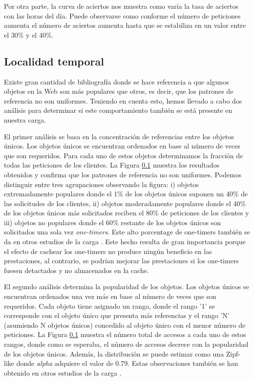 \documentclass[twocolumn]{Jornadas}
\begin{document}
Por otra parte, la curva de aciertos nos muestra como varía la tasa de aciertos con las horas del día. Puede observarse como conforme el número de peticiones aumenta el número de aciertos aumenta hasta que se estabiliza en un valor entre el 30\% y el 40\%.

\subsection{Localidad temporal}

Existe gran cantidad de bibliografía \cite{} donde se hace referencia a que algunos objetos en la Web son más populares que otros, es decir, que los patrones de referencia no son uniformes. Teniendo en cuenta esto, hemos llevado a cabo dos análisis para determinar si este comportamiento también se está presente en nuestra carga.

El primer análisis se basa en la concentración de referencias entre los objetos únicos. Los objetos únicos se encuentran ordenados en base al número de veces que son requeridos. Para cada uno de estos objetos determinamos la fracción de todas las peticiones de los clientes. La Figura \ref{} muestra los resultados obtenidos y confirma que los patrones de referencia no son uniformes. Podemos distinguir entre tres agrupaciones observando la figura: i) objetos extremadamente populares donde el 1\% de los objetos únicos suponen un 40\% de las solicitudes de los clientes, ii) objetos moderadamente populares donde el 40\% de los objetos únicos más solicitados reciben el 80\% de peticiones de los clientes y iii) objetos no populares donde el 60\% restante de los objetos únicos son solicitados una sola vez \emph{one-timers}. Este alto porcentage de one-timers también se da en otros estudios de la carga \cite{}.
Este hecho resulta de gran importancia porque el efecto de cachear los one-timers no produce ningún beneficio en las prestaciones, al contrario, se podrían mejorar las prestaciones si los one-timers fuesen detactados y no almacenados en la cache.

El segundo análisis determina la popularidad de los objetos. Los objetos únicos se encuentran ordenados una vez más en base al número de veces que son requeridos. Cada objeto tiene asignado un rango, donde el rango '1' se corresponde con el objeto único que presenta más referencias y el rango 'N' (asumiendo N objetos únicos) concedido al objeto único con el menor número de peticiones. La Figura \ref{} muestra el número total de accesos a cada uno de estos rangos, donde como se esperaba, el número de accesos decrece con la popularidad de los objetos únicos. Además, la distribución se puede estimar como una Zipf-like donde \emph{alpha} adquiere el valor de 0.79. Estas observaciones también se han obtenido en otros estudios de la carga \cite{}.
\end{document}
